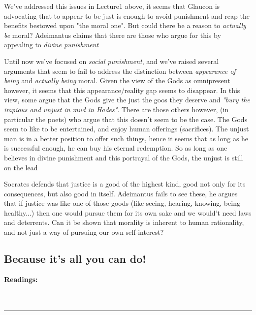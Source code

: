 \documentclass[english,course]{Notes}
\newcommand{\ita}[1]{\textit{#1}}
\newcommand\readings{\textbf{Readings:} \\}
\newcommand\sep{\\ \noindent\rule{10cm}{0.8pt} \\}
\begin{document}
\par{We've addressed this issues in Lecture1 above, it seems that Glaucon is advocating that to appear to be just is enough to avoid punishment and reap the benefits bestowed upon "the moral one". But could there be a reason to \ita{actually be} moral? Adeimantus claims that there are those who argue for this by appealing to \ita{divine punishment}}

\par{Until now we've focused on \ita{social punishment}, and we've raised several arguments that seem to fail to address the distinction between \ita{appearance of being} and \ita{actually being} moral. Given the view of the Gods as omnipresent however, it seems that this appearance/reality gap seems to disappear. In this view, some argue that the Gods give the just the goos they deserve and \ita{"bury the impious and unjust in mud in Hades"}. There are those others however, (in particular the poets) who argue that this doesn't seem to be the case. The Gods seem to like to be entertained, and enjoy human offerings (sacrifices). The unjust man is in a better position to offer such things, hence it seems that as long as he is successful enough, he can buy his eternal redemption. So as long as one believes in divine punishment and this portrayal of the Gods, the unjust is still on the lead}

\par{Socrates defends that justice is a good of the highest kind, good not only for its consequences, but also good in itself. Adeimantus fails to see these, he argues that if justice was like one of those goods (like seeing, hearing, knowing, being healthy...) then one would pursue them for its own sake and we would't need laws and deterrents. Can it be shown that morality is inherent to human rationality, and not just a way of pursuing our own self-interest?~}

\newpage


\subsection{Because it's all you can do!}

\readings \cite{PsychEgoism} \\ \cite{EthicalEgoism}
\sep
\end{document}
